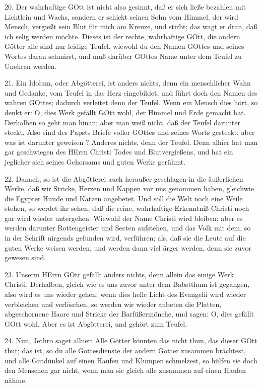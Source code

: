 20. Der wahrhaftige GOtt ist nicht also gesinnt, daß er sich ließe bezahlen mit Lichtlein und Wachs, sondern er schickt seinen Sohn vom Himmel, der wird Mensch, vergießt sein Blut für mich am Kreuze, und stirbt; das wagt er dran, daß ich selig werden möchte. Dieses ist der rechte, wahrhaftige GOtt, die andern Götter alle sind nur leidige Teufel, wiewohl du den Namen GOttes und seines Wortes daran schmirst, und muß darüber GOttes Name unter dem Teufel zu Unehren werden.

21. Ein Idolum, oder Abgötterei, ist anders nichts, denn ein menschlicher Wahn und Gedanke, vom Teufel in das Herz eingebildet, und führt doch den Namen des wahren GOttes; dadurch verleitet denn der Teufel. Wenn ein Mensch dies hört, so denkt er: O, dies Werk gefällt GOtt wohl, der Himmel und Erde gemacht hat. Derhalben so geht man hinan; aber man weiß nicht, daß der Teufel darunter steckt. Also sind des Papsts Briefe voller GOttes und seines Worts gesteckt; aber was ist darunter geweisen
? Anderes nichts, denn der Teufel. Denn alhier hat man gar geschwiegen des HErrn Christi Todes und Blutvergießens, und hat ein jeglicher sich seines Gehorsams und guten Werke gerühmt.

22. Danach, so ist die Abgötterei auch heraußer geschlagen in die äußerlichen Werke, daß wir Stricke, Herzen und Kappen vor uns genommen haben, gleichwie die Egypter Hunde und Katzen angebetet. Und soll die Welt noch eine Weile stehen, so werdet ihr sehen, daß die reine, wahrhaftige Erkenntniß Christi noch gar wird wieder untergehen. Wiewohl der Name Christi wird bleiben; aber es werden darunter Rottengeister und Secten aufstehen, und das Volk mit dem, so in der Schrift nirgends gefunden wird, verführen; als, daß sie die Leute auf die guten Werke weisen werden, und werden dann viel ärger werden, denn sie zuvor gewesen sind.

23. Unserm HErrn GOtt gefällt anders nichts, denn allein das einige Werk Christi. Derhalben, gleich wie es uns zuvor unter dem Babstthum ist gegangen, also wird es uns wieder gehen; wenn dies helle Licht des Evangelii wird wieder verbleichen und verlöschen, so werden wir wieder anbeten die Platten, abgeschornene Haare und Stricke der Barfüßermönche, und sagen: O, dies gefällt GOtt wohl. Aber es ist Abgötterei, und gehört zum Teufel.

24. Nun, Jethro saget alhier: Alle Götter könnten das nicht thun, das dieser GOtt thut; das ist, so du alle Gottesdienste der andern Götter zusammen brächtest, und alle Gutdünkel auf einen Haufen und Klumpen schmelzest, so hülfen sie doch den Menschen gar nicht, wenn man sie gleich alle zusammen auf einen Haufen nähme.

